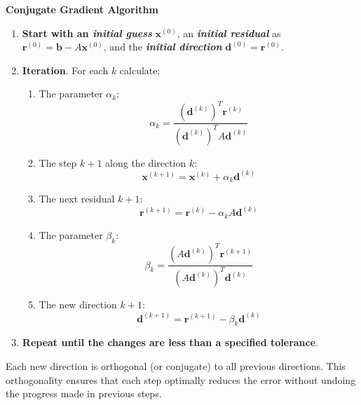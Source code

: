 \begin{flushleft}
    \textcolor{Green3}{ \textbf{Conjugate Gradient Algorithm}}
\end{flushleft}
\begin{enumerate}
    \item \textbf{Start with an \emph{initial guess}} $\mathbf{x}^{\left(0\right)}$, an \textbf{\emph{initial residual}} as $\mathbf{r}^{\left(0\right)} = \mathbf{b} - A\mathbf{x}^{\left(0\right)}$, and the \textbf{\emph{initial direction}} $\mathbf{d}^{\left(0\right)} = \mathbf{r}^{\left(0\right)}$.
    \item \textbf{Iteration}. For each $k$ calculate:
    \begin{enumerate}
        \item The parameter $\alpha_{k}$:
        \begin{equation}
            \alpha_{k} = \dfrac{
                \left(\mathbf{d}^{\left(k\right)}\right)^{T}\mathbf{r}^{\left(k\right)}
            }{
                \left(\mathbf{d}^{\left(k\right)}\right)^{T}A\mathbf{d}^{\left(k\right)}
            }
        \end{equation}

        \item The step $k+1$ along the direction $k$:
        \begin{equation}
            \mathbf{x}^{\left(k+1\right)} = \mathbf{x}^{\left(k\right)} + \alpha_{k}\mathbf{d}^{\left(k\right)}
        \end{equation}

        \item The next residual $k+1$:
        \begin{equation}
            \mathbf{r}^{\left(k+1\right)} = \mathbf{r}^{\left(k\right)} - \alpha_{k}A\mathbf{d}^{\left(k\right)}
        \end{equation}

        \item The parameter $\beta_{k}$:
        \begin{equation}
            \beta_{k} = \dfrac{
                \left(A\mathbf{d}^{\left(k\right)}\right)^{T}\mathbf{r}^{\left(k+1\right)}
            }{
                \left(A\mathbf{d}^{\left(k\right)}\right)^{T}\mathbf{d}^{\left(k\right)}
            }
        \end{equation}

        \item The new direction $k+1$:
        \begin{equation}
            \mathbf{d}^{\left(k+1\right)} = \mathbf{r}^{\left(k+1\right)} - \beta_{k}\mathbf{d}^{\left(k\right)}
        \end{equation}
    \end{enumerate}
    \item \textbf{Repeat until the changes are less than a specified tolerance}.
\end{enumerate}
Each new direction is orthogonal (or conjugate) to all previous directions. This orthogonality ensures that each step optimally reduces the error without undoing the progress made in previous steps.


